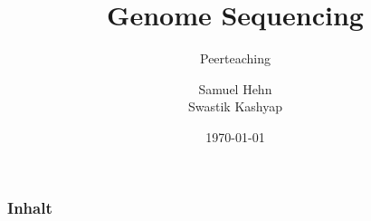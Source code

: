 \documentclass{beamer}
\title{Genome Sequencing}
\subtitle{Peerteaching}
\author{Samuel Hehn \\ Swastik Kashyap}
\institute{Universität Tübingen}
\date{\today}
\begin{document}
    {
    \begin{frame}
        \titlepage
    \end{frame}
    }

    {
    \begin{frame}
        \frametitle{Inhalt}
        \tableofcontents
    \end{frame}
    }
\end{document}

